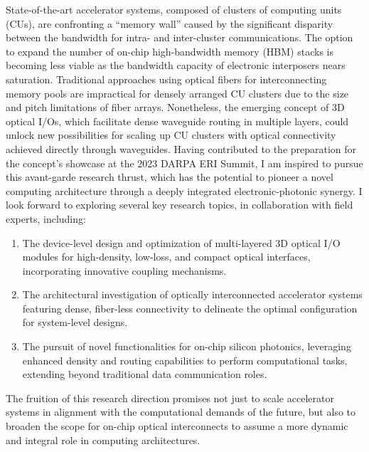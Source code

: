 State-of-the-art accelerator systems, composed of clusters of computing units (CUs), are confronting a ``memory wall'' caused by the significant disparity between the bandwidth for intra- and inter-cluster communications. The option to expand the number of on-chip high-bandwidth memory (HBM) stacks is becoming less viable as the bandwidth capacity of electronic interposers nears saturation. Traditional approaches using optical fibers for interconnecting memory pools are impractical for densely arranged CU clusters due to the size and pitch limitations of fiber arrays. Nonetheless, the emerging concept of 3D optical I/Os, which facilitate dense waveguide routing in multiple layers, could unlock new possibilities for scaling up CU clusters with optical connectivity achieved directly through waveguides. Having contributed to the preparation for the concept's showcase at the 2023 DARPA ERI Summit, I am inspired to pursue this avant-garde research thrust, which has the potential to pioneer a novel computing architecture through a deeply integrated electronic-photonic synergy. I look forward to exploring several key research topics, in collaboration with field experts, including:
\begin{enumerate}[nosep]
    \item The device-level design and optimization of multi-layered 3D optical I/O modules for high-density, low-loss, and compact optical interfaces, incorporating innovative coupling mechanisms.
    \item The architectural investigation of optically interconnected accelerator systems featuring dense, fiber-less connectivity to delineate the optimal configuration for system-level designs.
    \item The pursuit of novel functionalities for on-chip silicon photonics, leveraging enhanced density and routing capabilities to perform computational tasks, extending beyond traditional data communication roles.
\end{enumerate}
The fruition of this research direction promises not just to scale accelerator systems in alignment with the computational demands of the future, but also to broaden the scope for on-chip optical interconnects to assume a more dynamic and integral role in computing architectures.


